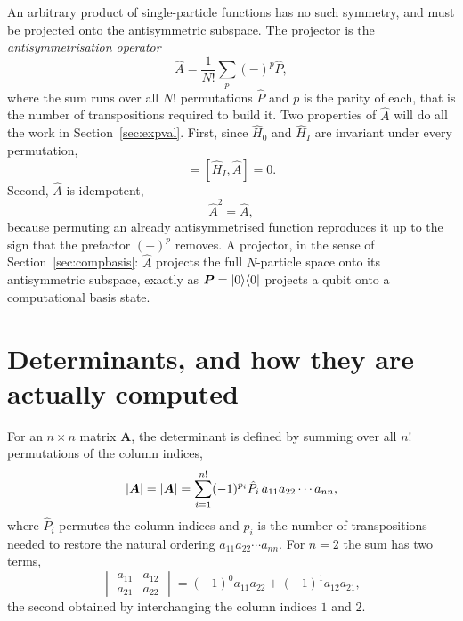 An arbitrary product of single-particle functions has no such symmetry, and
must be projected onto the antisymmetric subspace.  The projector is the
\emph{antisymmetrisation operator}
\begin{equation}
  \hat{A} = \frac{1}{N!}\sum_{p}(-)^{p}\hat{P},
  \label{eq:2-antisym}
\end{equation}
where the sum runs over all $N!$ permutations $\hat{P}$ and $p$ is the parity
of each, that is the number of transpositions required to build it.  Two
properties of $\hat{A}$ will do all the work in Section~\ref{sec:expval}.
First, since $\hat{H}_0$ and $\hat{H}_I$ are invariant under every
permutation,
\begin{equation}
  [\hat{H}_0,\hat{A}] = [\hat{H}_I,\hat{A}] = 0 .
  \label{eq:2-commuteA}
\end{equation}
Second, $\hat{A}$ is idempotent,
\begin{equation}
  \hat{A}^2 = \hat{A},
  \label{eq:Asq}
\end{equation}
because permuting an already antisymmetrised function reproduces it up to the
sign that the prefactor $(-)^p$ removes.  A projector, in the sense of
Section~\ref{sec:compbasis}: $\hat{A}$ projects the full $N$-particle space
onto its antisymmetric subspace, exactly as $\bm{P}=\vert 0 \rangle\langle 0 \vert$ projects a
qubit onto a computational basis state.

\section{Determinants, and how they are actually computed}
\label{sec:determinants}

For an $n\times n$ matrix $\bm{A}$, the determinant is defined by summing over
all $n!$ permutations of the column indices,
\begin{equation}
  {|\boldsymbol{A}|} = |\bm{A}|
   = \sum_{i=1}^{n!}(-1)^{p_i}\hat{P}_i\,a_{11}a_{22}\cdots a_{nn},
  \label{eq:2-detdef}
\end{equation}
where $\hat{P}_i$ permutes the column indices and $p_i$ is the number of
transpositions needed to restore the natural ordering $a_{11}a_{22}\cdots
a_{nn}$.  For $n=2$ the sum has two terms,
\begin{equation}
  \begin{vmatrix}a_{11}&a_{12}\\a_{21}&a_{22}\end{vmatrix}
   = (-1)^0 a_{11}a_{22} + (-1)^1 a_{12}a_{21},
  \label{eq:2-det2}
\end{equation}
the second obtained by interchanging the column indices $1$ and $2$.

